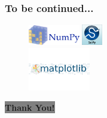 \documentclass[12pt, aspectratio=169]{beamer}
\begin{document}
 \begin{frame}[fragile]
   \frametitle{To be continued...}
   \begin{figure}
     \vspace{-2em}
   \includegraphics[width=0.20\textwidth]{numpy}   
   \includegraphics[width=0.08\textwidth]{scipy}  \\ 
   \includegraphics[width=0.24\textwidth]{matplot} 
   \end{figure}


   \hspace{12em}\centering\colorbox{gray}{\textbf{ \linebreak\huge{Thank You!}\linebreak}}
 \end{frame}

 
\end{document}
